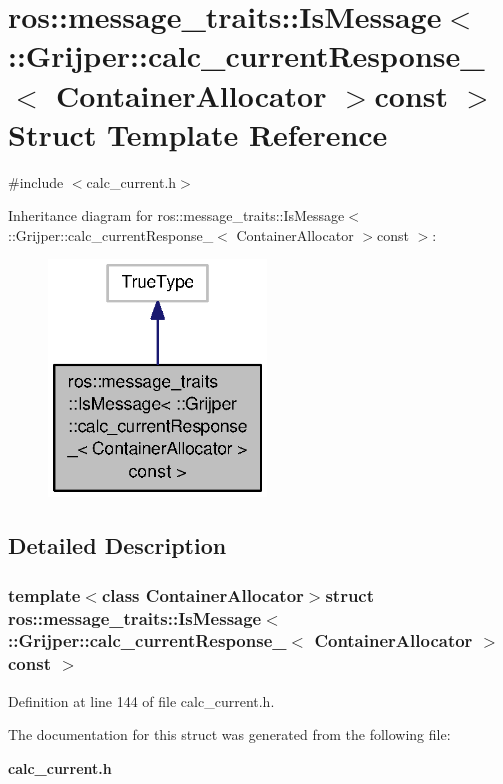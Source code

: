 \section{ros\-:\-:message\-\_\-traits\-:\-:Is\-Message$<$ \-:\-:Grijper\-:\-:calc\-\_\-current\-Response\-\_\-$<$ Container\-Allocator $>$const $>$ Struct Template Reference}
\label{structros_1_1message__traits_1_1IsMessage_3_01_1_1Grijper_1_1calc__currentResponse___3_01ContainerAllocator_01_4const_01_01_4}


{\ttfamily \#include $<$calc\-\_\-current.\-h$>$}



Inheritance diagram for ros\-:\-:message\-\_\-traits\-:\-:Is\-Message$<$ \-:\-:Grijper\-:\-:calc\-\_\-current\-Response\-\_\-$<$ Container\-Allocator $>$const $>$\-:\nopagebreak
\begin{figure}[H]
\begin{center}
\leavevmode
\includegraphics[width=164pt]{structros_1_1message__traits_1_1IsMessage_3_01_1_1Grijper_1_1calc__currentResponse___3_01Containa1a9ac6248f68a3f39ec2eb109bef063}
\end{center}
\end{figure}


\subsection{Detailed Description}
\subsubsection*{template$<$class Container\-Allocator$>$struct ros\-::message\-\_\-traits\-::\-Is\-Message$<$ \-::\-Grijper\-::calc\-\_\-current\-Response\-\_\-$<$ Container\-Allocator $>$const  $>$}



Definition at line 144 of file calc\-\_\-current.\-h.



The documentation for this struct was generated from the following file\-:\begin{DoxyCompactItemize}
\item 
{\bf calc\-\_\-current.\-h}\end{DoxyCompactItemize}
